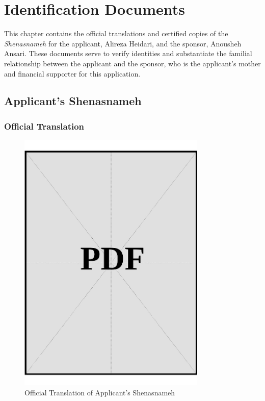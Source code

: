 
\chapter{Identification Documents}\label{sec:identification-documents}

\noindent
This chapter contains the official translations and certified copies of the \textit{Shenasnameh} for the applicant, Alireza Heidari, and the sponsor, Anousheh Ansari. These documents serve to verify identities and substantiate the familial relationship between the applicant and the sponsor, who is the applicant's mother and financial supporter for this application.

\clearpage
\section{Applicant's Shenasnameh}\label{sec:applicant-shenasnameh}

\subsection*{Official Translation}

\vspace*{\fill}
\begin{figure}[h]
    \centering
    \includegraphics[page=1, width=0.8\textwidth]{../application-docs/applicant/identification/shenasnameh/official-translations.pdf}
    \caption{Official Translation of Applicant's Shenasnameh}
    \label{fig:applicant-shenasnameh-official-translation}
\end{figure}
\vspace*{\fill}

